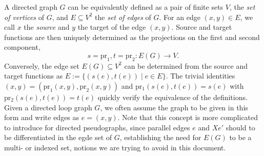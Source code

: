 








\begin{remark}  
  A directed graph $G$ can be equivalently defined
   as a pair
  of finite sets $V$, the \textit{set of vertices} of $G$, and $E
  \subseteq V^2$ the \textit{set of edges} of $G$.  For an edge $(x,y)
  \in E$, we call $x$ the \textit{source} and $y$ the target of the
  edge $(x,y)$. Source and target functions are then uniquely
  determined as the projections on the first and second component, 
  \[s = \mathrm{pr}_1, t = \mathrm{pr}_2: E(G) \to V.\] Conversely,
  the edge set $E(G) \subseteq V^2$ can be determined from the source
  and target functions as $E:=\{(s(e),t(e)) \mid e \in E\}$. The
  trivial identities $(x,y) = (\mathrm{pr}_1(x,y),\mathrm{pr}_2(x,y))$
  and $\mathrm{pr_1}(s(e), t(e)) = s(e)$ with $\mathrm{pr_2}(s(e),
  t(e)) = t(e)$ quickly verify the equivalence of the definitions.
  Given a directed loop graph $G$, we often assume the graph to be
  given in this form and write edges as $e=(x,y)$. Note that this
  concept is more complicated to introduce for directed pseudographs,
  since parallel edges $e$ and $Xe'$ should to be differentiated in the
  egde set of $G$, establishing the need for $E(G)$ to be a multi- or
  indexed set, notions we are trying to avoid in this document.
\end{remark}







